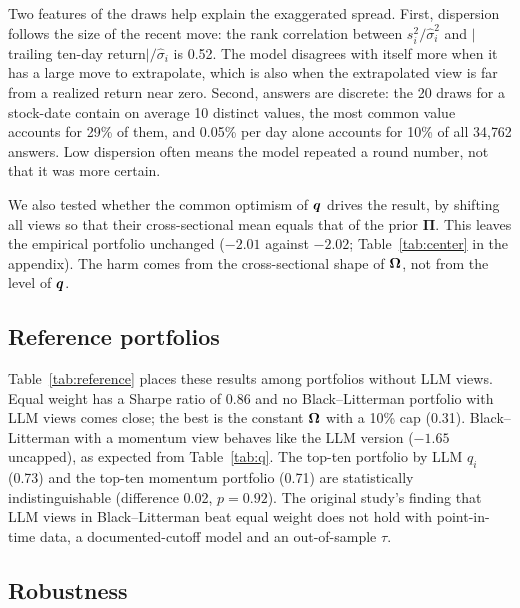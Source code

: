Two features of the draws help explain the exaggerated spread. First, dispersion follows the size of the recent move: the rank correlation between $s_i^2/\hat\sigma_i^2$ and $|$trailing ten-day return$|/\hat\sigma_i$ is 0.52. The model disagrees with itself more when it has a large move to extrapolate, which is also when the extrapolated view is far from a realized return near zero. Second, answers are discrete: the 20 draws for a stock-date contain on average 10 distinct values, the most common value accounts for 29\% of them, and 0.05\% per day alone accounts for 10\% of all 34{,}762 answers. Low dispersion often means the model repeated a round number, not that it was more certain.

We also tested whether the common optimism of $\bm{q}$ drives the result, by shifting all views so that their cross-sectional mean equals that of the prior $\bm{\Pi}$. This leaves the empirical portfolio unchanged ($-2.01$ against $-2.02$; Table~\ref{tab:center} in the appendix). The harm comes from the cross-sectional shape of $\bm{\Omega}$, not from the level of $\bm{q}$.

\subsection{Reference portfolios}\label{sec:res_ref}
Table~\ref{tab:reference} places these results among portfolios without LLM views. Equal weight has a Sharpe ratio of 0.86 and no Black--Litterman portfolio with LLM views comes close; the best is the constant $\bm{\Omega}$ with a 10\% cap (0.31). Black--Litterman with a momentum view behaves like the LLM version ($-1.65$ uncapped), as expected from Table~\ref{tab:q}. The top-ten portfolio by LLM $q_i$ (0.73) and the top-ten momentum portfolio (0.71) are statistically indistinguishable (difference 0.02, $p=0.92$). The original study's finding that LLM views in Black--Litterman beat equal weight does not hold with point-in-time data, a documented-cutoff model and an out-of-sample $\tau$.

\begin{table}[t]
\centering
\caption{Reference portfolios, 2025, 10 bp costs. Max $w$: largest single weight at any rebalancing date. Right block: same strategy with a 10\% weight cap, where it applies.}
\label{tab:reference}
\small

\end{table}

\subsection{Robustness}\label{sec:robust}
